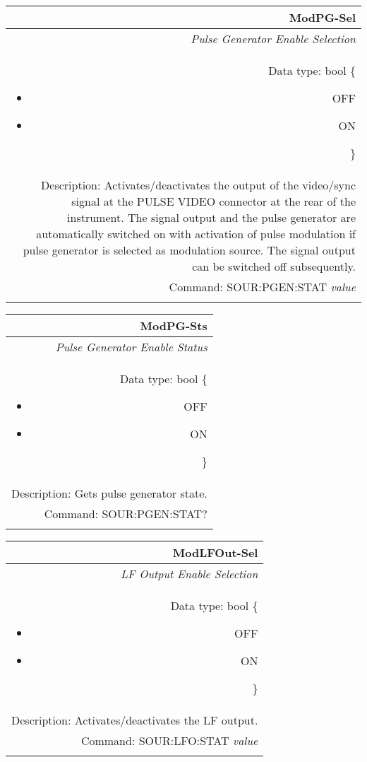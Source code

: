 \documentclass[openany]{article}
\begin{document}
		\begin{tabular}{N}
			\hline
			\bfseries ModPG-Sel \\ \hline
			\emph{Pulse Generator Enable Selection} \\
			Data type: bool \{\begin{itemize}[noitemsep]
				\small
				\item[] OFF
				\item[] ON
			\end{itemize}\} \\
			Description: Activates/deactivates the output of the video/sync signal at the PULSE VIDEO connector at the rear of the instrument. The signal output and the pulse generator are automatically switched on with activation of pulse modulation if pulse generator is selected as modulation source. The signal output can be switched off subsequently. \\
			Command: SOUR:PGEN:STAT \emph{value} \\
			\\

		\end{tabular}


		\begin{tabular}{N}
			\hline
			\bfseries ModPG-Sts \\ \hline
			\emph{Pulse Generator Enable Status} \\
			Data type: bool \{\begin{itemize}[noitemsep]
				\small
				\item[] OFF
				\item[] ON
			\end{itemize}\} \\
			Description: Gets pulse generator state. \\
			Command: SOUR:PGEN:STAT? \\
			\\
			
		\end{tabular}


		\begin{tabular}{N}
			\hline
			\bfseries ModLFOut-Sel \\ \hline
			\emph{LF Output Enable Selection} \\
			Data type: bool \{\begin{itemize}[noitemsep]
				\small
				\item[] OFF
				\item[] ON
			\end{itemize}\} \\
			Description: Activates/deactivates the LF output. \\
			Command: SOUR:LFO:STAT \emph{value} \\
			\\

		\end{tabular}
\end{document}
